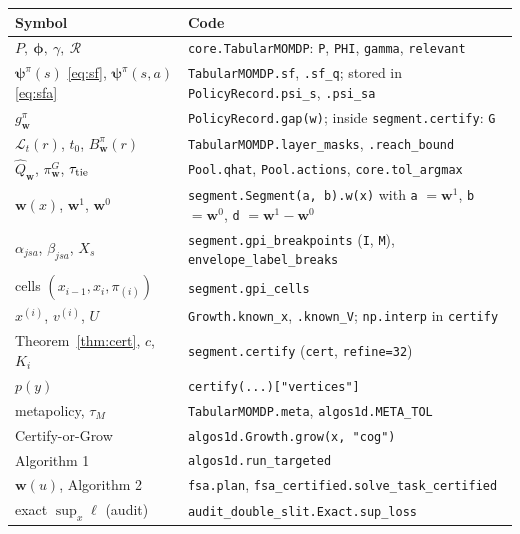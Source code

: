 \documentclass[11pt]{article}
\newcommand{\vphi}{\bm{\phi}}
\newcommand{\vpsi}{\bm{\psi}}
\newcommand{\w}{\mathbf{w}}
\newcommand{\cR}{\mathcal R}
\newcommand{\cL}{\mathcal L}
\theoremstyle{definition}
\begin{document}
\begin{center}
\small
\begin{tabular}{@{}ll@{}}
\toprule
Symbol & Code \\
\midrule
$P,\ \vphi,\ \gamma,\ \cR$ & \texttt{core.TabularMOMDP}: \texttt{P}, \texttt{PHI}, \texttt{gamma}, \texttt{relevant} \\
$\vpsi^\pi(s)$ \eqref{eq:sf}, $\vpsi^\pi(s,a)$ \eqref{eq:sfa} & \texttt{TabularMOMDP.sf}, \texttt{.sf\_q}; stored in \texttt{PolicyRecord.psi\_s}, \texttt{.psi\_sa} \\
$g^\pi_\w$ & \texttt{PolicyRecord.gap(w)}; inside \texttt{segment.certify}: \texttt{G} \\
$\cL_t(r)$, $t_0$, $B^\pi_\w(r)$ & \texttt{TabularMOMDP.layer\_masks}, \texttt{.reach\_bound} \\
$\hat Q_\w$, $\pi^G_\w$, $\tau_{\rm tie}$ & \texttt{Pool.qhat}, \texttt{Pool.actions}, \texttt{core.tol\_argmax} \\
$\w(x)$, $\w^1$, $\w^0$ & \texttt{segment.Segment(a, b).w(x)} with \texttt{a} $=\w^1$, \texttt{b} $=\w^0$, \texttt{d} $=\w^1-\w^0$ \\
$\alpha_{jsa}$, $\beta_{jsa}$, $X_s$ & \texttt{segment.gpi\_breakpoints} (\texttt{I}, \texttt{M}), \texttt{envelope\_label\_breaks} \\
cells $(x_{i-1},x_i,\pi_{(i)})$ & \texttt{segment.gpi\_cells} \\
$x^{(i)}$, $v^{(i)}$, $U$ & \texttt{Growth.known\_x}, \texttt{.known\_V}; \texttt{np.interp} in \texttt{certify} \\
Theorem~\ref{thm:cert}, $c$, $K_i$ & \texttt{segment.certify} (\texttt{cert}, \texttt{refine=32}) \\
$p(y)$ & \texttt{certify(...)["vertices"]} \\
metapolicy, $\tau_M$ & \texttt{TabularMOMDP.meta}, \texttt{algos1d.META\_TOL} \\
Certify-or-Grow & \texttt{algos1d.Growth.grow(x, "cog")} \\
Algorithm 1 & \texttt{algos1d.run\_targeted} \\
$\w(u)$, Algorithm 2 & \texttt{fsa.plan}, \texttt{fsa\_certified.solve\_task\_certified} \\
exact $\sup_x\ell$ (audit) & \texttt{audit\_double\_slit.Exact.sup\_loss} \\
\bottomrule
\end{tabular}
\end{center}
\end{document}
